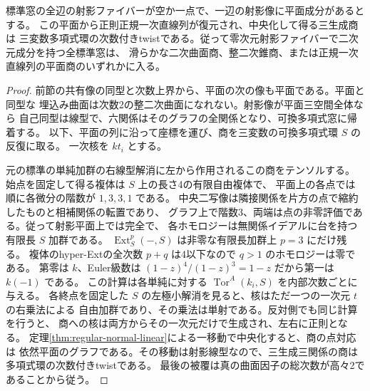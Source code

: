 \begin{theorem}\label{thm:plane-surface-normal}
標準窓の全辺の射影ファイバーが空か一点で、一辺の射影像に平面成分があるとする。
この平面から正則正規一次直線列が復元され、中央化して得る三生成商は
三変数多項式環の次数付きtwistである。従って零次元射影ファイバーで二次元成分を持つ全標準窓は、
滑らかな二次曲面商、整二次錐商、または正規一次直線列の平面商のいずれかに入る。
\end{theorem}
\begin{proof}
前節の共有像の同型と次数上界から、平面の次の像も平面である。平面と同型な
埋込み曲面は次数2の整二次曲面になれない。射影像が平面三空間全体なら
自己同型は線型で、六関係はそのグラフの全関係となり、可換多項式窓に帰着する。
以下、平面の列に沿って座標を運び、商を三変数の可換多項式環 $S$ の反復に取る。
一次核を $kt_i$ とする。

元の標準の単純加群の右線型解消に左から作用されるこの商をテンソルする。
始点を固定して得る複体は $S$ 上の長さ4の有限自由複体で、
平面上の各点では順に各微分の階数が $1,3,3,1$ である。
中央二写像は隣接関係を片方の点で縮約したものと相補関係の転置であり、
グラフ上で階数3、両端は点の非零評価である。従って射影平面上では完全で、
各ホモロジーは無関係イデアルに台を持つ有限長 $S$ 加群である。
$\operatorname{Ext}^p_S(-,S)$ は非零な有限長加群上 $p=3$ にだけ残る。
複体のhyper-Extの全次数 $p+q$ は4以下なので $q>1$ のホモロジーは零である。
第零は $k$、Euler級数は $(1-z)^4/(1-z)^3=1-z$ だから第一は $k(-1)$ である。
この計算は各単純に対する $\operatorname{Tor}^A(k_i,S)$ を内部次数ごとに与える。
各終点を固定した $S$ の左極小解消を見ると、核はただ一つの一次元 $t$ の右乗法による
自由加群であり、その乗法は単射である。反対側でも同じ計算を行うと、
商への核は両方からその一次元だけで生成され、左右に正則となる。
定理\ref{thm:regular-normal-linear}による一移動で中央化すると、商の点対応は
依然平面のグラフである。その移動は射影線型なので、三生成三関係の商は多項式環の次数付きtwistである。
最後の被覆は真の曲面因子の総次数が高々2であることから従う。
\end{proof}
